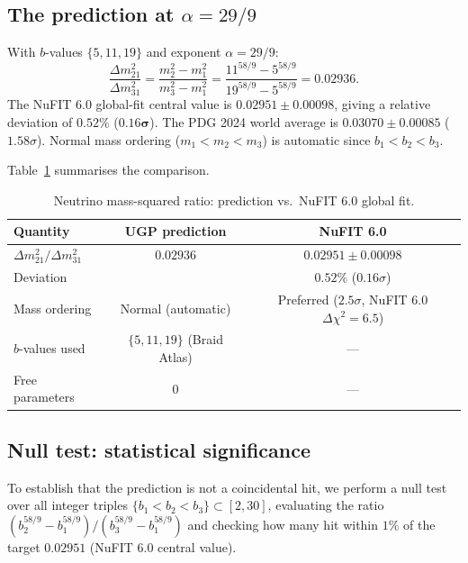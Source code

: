 \documentclass[12pt,a4paper]{article}
\theoremstyle{definition}
\theoremstyle{remark}
\begin{document}
\subsection{The prediction at $\alpha = 29/9$}
\label{subsec:result}

With $b$-values $\{5, 11, 19\}$ and exponent $\alpha = 29/9$:
\begin{equation}
  \frac{\Delta m^2_{21}}{\Delta m^2_{31}}
  = \frac{m_2^2 - m_1^2}{m_3^2 - m_1^2}
  = \frac{11^{58/9} - 5^{58/9}}{19^{58/9} - 5^{58/9}}
  = 0.02936.
  \label{eq:ratio_pred}
\end{equation}
The NuFIT 6.0 global-fit central value is $0.02951 \pm 0.00098$, giving a relative
deviation of $\mathbf{0.52\%}$ ($\mathbf{0.16\sigma}$).  The PDG 2024 world average is $0.03070 \pm 0.00085$ ($1.58\sigma$).
Normal mass ordering ($m_1 < m_2 < m_3$) is automatic
since $b_1 < b_2 < b_3$.

Table~\ref{tab:ratio} summarises the comparison.

\begin{table}[h]
\centering
\caption{Neutrino mass-squared ratio: prediction vs.\ NuFIT 6.0 global fit.}
\label{tab:ratio}
\renewcommand{\arraystretch}{1.15}
\begin{tabular}{lcc}
\toprule
\textbf{Quantity} & \textbf{UGP prediction} & \textbf{NuFIT 6.0} \\
\midrule
$\Delta m^2_{21}/\Delta m^2_{31}$ & $0.02936$ & $0.02951 \pm 0.00098$ \\
Deviation & & $0.52\%$ ($0.16\sigma$) \\
Mass ordering & Normal (automatic) & Preferred ($2.5\sigma$, NuFIT 6.0 $\Delta\chi^2=6.5$) \\
$b$-values used & $\{5, 11, 19\}$ (Braid Atlas) & --- \\
Free parameters & 0 & --- \\
\bottomrule
\end{tabular}
\end{table}

\subsection{Null test: statistical significance}
\label{subsec:null}

To establish that the prediction is not a coincidental hit,
we perform a null test over all integer triples
$\{b_1 < b_2 < b_3\} \subset [2, 30]$, evaluating the ratio
$(b_2^{58/9} - b_1^{58/9})/(b_3^{58/9} - b_1^{58/9})$
and checking how many hit within $1\%$ of the target $0.02951$ (NuFIT 6.0 central value).
\end{document}
